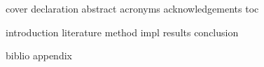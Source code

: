 \documentclass{article}
\begin{document}
{cover}
{declaration}
{abstract}
{acronyms}
{acknowledgements}
{toc}

{introduction}
{literature}
{method}
{impl}
{results}
{conclusion}

{biblio}
{appendix}
\end{document}
